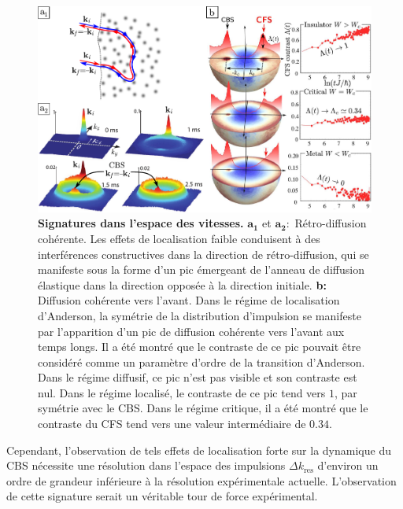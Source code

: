 \begin{figure}
\centering
\includegraphics[width=\textwidth]{Fig/Conclusion/cbs_cfs.pdf}
\caption{\textbf{Signatures dans l'espace des vitesses.} $\mathbf{a_1}$ et $\mathbf{a_2:}$ Rétro-diffusion cohérente. Les effets de localisation faible conduisent à des interférences constructives dans la direction de rétro-diffusion, qui se manifeste sous la forme d'un pic émergeant de l'anneau de diffusion élastique dans la direction opposée à la direction initiale. \textbf{b:} Diffusion cohérente vers l'avant. Dans le régime de localisation d'Anderson, la symétrie de la distribution d'impulsion se manifeste par l'apparition d'un pic de diffusion cohérente vers l'avant aux temps longs. Il a été montré que le contraste de ce pic pouvait être considéré comme un paramètre d'ordre de la transition d'Anderson. Dans le régime diffusif, ce pic n'est pas visible et son contraste est nul. Dans le régime localisé, le contraste de ce pic tend vers $1$, par symétrie avec le CBS. Dans le régime critique, il a été montré que le contraste du CFS tend vers une valeur intermédiaire de $0.34$. }
\label{fig:cbs_cfs}
\end{figure}

Cependant, l'observation de tels effets de localisation forte sur la dynamique du CBS nécessite une résolution dans l'espace des impulsions $\Delta k_{\mathrm{res}}$ d'environ un ordre de grandeur inférieure à la résolution expérimentale actuelle. L'observation de cette signature serait un véritable tour de force expérimental.



